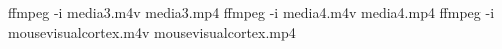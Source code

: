  ffmpeg -i media3.m4v media3.mp4
 ffmpeg -i media4.m4v media4.mp4
 ffmpeg -i mousevisualcortex.m4v mousevisualcortex.mp4
